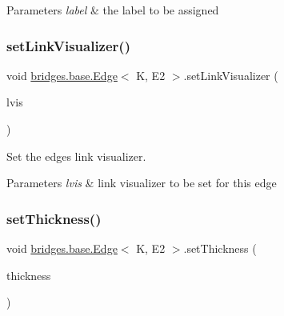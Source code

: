 \begin{DoxyParams}{Parameters}
{\em label} & the label to be assigned \\
\hline
\end{DoxyParams}
\mbox{\label{classbridges_1_1base_1_1_edge_a1bb8008507d26245468bf9d0f1452072}} 
\subsubsection{\texorpdfstring{setLinkVisualizer()}{setLinkVisualizer()}}
{\footnotesize\ttfamily void \mbox{\hyperlink{classbridges_1_1base_1_1_edge}{bridges.\+base.\+Edge}}$<$ K, E2 $>$.set\+Link\+Visualizer (\begin{DoxyParamCaption}\item[{\mbox{\hyperlink{classbridges_1_1base_1_1_link_visualizer}{Link\+Visualizer}}}]{lvis }\end{DoxyParamCaption})}



Set the edge\textquotesingle{}s link visualizer. 


\begin{DoxyParams}{Parameters}
{\em lvis} & link visualizer to be set for this edge \\
\hline
\end{DoxyParams}
\mbox{\label{classbridges_1_1base_1_1_edge_ae8d87539f03f04479e5f5710ea9bf260}} 
\subsubsection{\texorpdfstring{setThickness()}{setThickness()}}
{\footnotesize\ttfamily void \mbox{\hyperlink{classbridges_1_1base_1_1_edge}{bridges.\+base.\+Edge}}$<$ K, E2 $>$.set\+Thickness (\begin{DoxyParamCaption}\item[{double}]{thickness }\end{DoxyParamCaption})}



